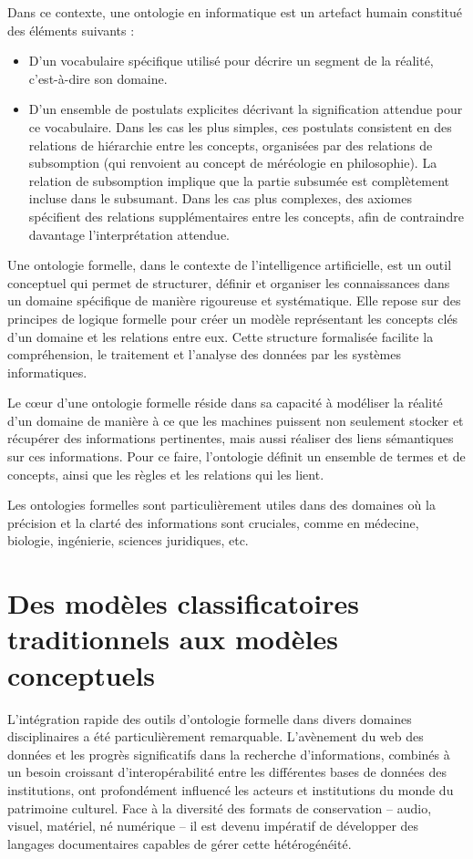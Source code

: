 \documentclass[12pt]{report}
\begin{document}
Dans ce contexte, une ontologie en informatique est un artefact humain constitué des éléments suivants\autocite{inbook, Gruber1995Ontologies} :
\begin{itemize}
\item D'un vocabulaire spécifique utilisé pour décrire un segment de la réalité, c'est-à-dire son domaine.
\item D'un ensemble de postulats explicites décrivant la signification attendue pour ce vocabulaire. Dans les cas les plus simples, ces postulats consistent en des relations de hiérarchie entre les concepts, organisées par des relations de subsomption (qui renvoient au concept de méréologie en philosophie). La relation de subsomption implique que la partie subsumée est complètement incluse dans le subsumant. Dans les cas plus complexes, des axiomes spécifient des relations supplémentaires entre les concepts, afin de contraindre davantage l'interprétation attendue.
\end{itemize}

Une ontologie formelle, dans le contexte de l'intelligence artificielle, est un outil conceptuel qui permet de structurer, définir et organiser les connaissances dans un domaine spécifique de manière rigoureuse et systématique. Elle repose sur des principes de logique formelle pour créer un modèle représentant les concepts clés d'un domaine et les relations entre eux. Cette structure formalisée facilite la compréhension, le traitement et l'analyse des données par les systèmes informatiques.

Le cœur d'une ontologie formelle réside dans sa capacité à modéliser la réalité d'un domaine de manière à ce que les machines puissent non seulement stocker et récupérer des informations pertinentes, mais aussi réaliser des liens sémantiques sur ces informations. Pour ce faire, l'ontologie définit un ensemble de termes et de concepts, ainsi que les règles et les relations qui les lient.

Les ontologies formelles sont particulièrement utiles dans des domaines où la précision et la clarté des informations sont cruciales, comme en médecine, biologie, ingénierie, sciences juridiques, etc.

\newpage
\chapter{Des modèles classificatoires traditionnels aux modèles conceptuels}
L'intégration rapide des outils d'ontologie formelle dans divers domaines disciplinaires a été particulièrement remarquable. L'avènement du web des données et les progrès significatifs dans la recherche d'informations, combinés à un besoin croissant d'interopérabilité entre les différentes bases de données des institutions, ont profondément influencé les acteurs et institutions du monde du patrimoine culturel. Face à la diversité des formats de conservation – audio, visuel, matériel, né numérique – il est devenu impératif de développer des langages documentaires capables de gérer cette hétérogénéité.
\end{document}
